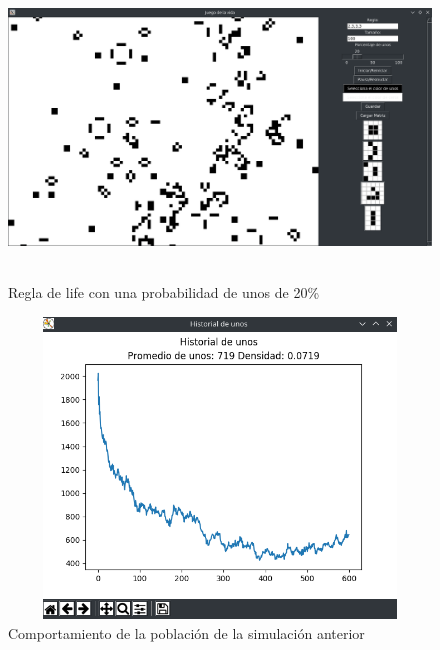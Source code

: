 \begin{figure}[H]
\begin{center}
 \includegraphics[width=12cm, height=8cm]{./img/life20.png}
 \caption{Regla de life con una probabilidad de unos de 20\%}
 \label{fig:life20}
\end{center}
\end{figure}

\begin{figure}[H]
\begin{center}
 \includegraphics[width=12cm, height=8cm]{./img/life20grafica.png}
 \caption{Comportamiento de la población de la simulación anterior}
 \label{fig:life20grafica}
\end{center}
\end{figure}

